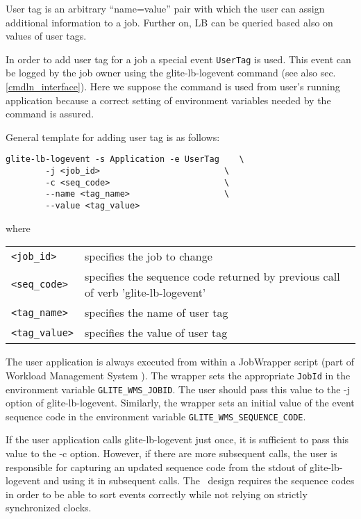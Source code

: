 

User tag is an arbitrary ``name=value'' pair with which the user can 
assign additional information to a job. Further on, LB can be queried
based also on values of user tags.

In order to add user tag for a job a special event \verb+UserTag+ is used. This
event can be logged by the job owner using the glite-lb-logevent command (see also
sec.\ref{cmdln_interface}). Here we suppose the command is used from user's running
 application because a correct setting of environment variables needed by 
the command is assured.

General template for adding user tag is as follows:

\begin{verbatim}
glite-lb-logevent -s Application -e UserTag    \
        -j <job_id>                         \
        -c <seq_code>                       \
        --name <tag_name>                   \
        --value <tag_value>
\end{verbatim}

where

\begin{tabularx}{\textwidth}{lX}
\verb'<job_id>'    & specifies the job to change \\
\verb'<seq_code>'   & specifies the sequence code returned by previous call
			of verb 'glite-lb-logevent'\\
\verb'<tag_name>'    & specifies the name of user tag\\
\verb'<tag_value>' & specifies the value of user tag\\
\end{tabularx}

The user application is always executed from within a JobWrapper script (part of Workload Management System \cite{WMS}). The wrapper  sets the  appropriate \verb'JobId' in the environment variable \verb'GLITE_WMS_JOBID'. The user should pass this value to the -j option of glite-lb-logevent.  Similarly, the wrapper sets an initial value of the event sequence code in the environment variable \verb'GLITE_WMS_SEQUENCE_CODE'.

If the user application calls glite-lb-logevent just once, it is sufficient to pass this value to the -c option.  However, if there are more  subsequent calls,  the  user is responsible for capturing an updated sequence code from the stdout of glite-lb-logevent and using it in subsequent calls.  The \LB\ design requires the sequence codes in  order  to  be able to sort events correctly while not relying on strictly synchronized clocks.  

